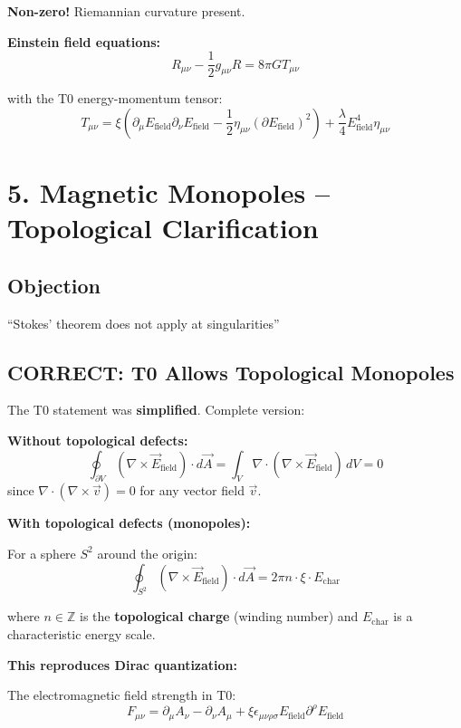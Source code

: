 	\textbf{Non-zero!} \checkmark Riemannian curvature present.
	
	\textbf{Einstein field equations:}
	\[
	R_{\mu\nu} - \frac{1}{2} g_{\mu\nu} R = 8\pi G T_{\mu\nu}
	\]
	
	with the T0 energy-momentum tensor:
	\[
	T_{\mu\nu} = \xi (\partial_\mu E_{\text{field}} \partial_\nu E_{\text{field}} - \frac{1}{2} \eta_{\mu\nu} (\partial E_{\text{field}})^2) + \frac{\lambda}{4} E_{\text{field}}^4 \eta_{\mu\nu}
	\]
	
	\section*{5. Magnetic Monopoles – Topological Clarification}
	
	\subsection*{Objection}
	``Stokes' theorem does not apply at singularities''
	
	\subsection*{\textbf{CORRECT: T0 Allows Topological Monopoles}}
	
	The T0 statement was \textbf{simplified}. Complete version:
	
	\textbf{Without topological defects:}
	\[
	\oint_{\partial V} (\nabla \times \vec{E}_{\text{field}}) \cdot d\vec{A} = \int_V \nabla \cdot (\nabla \times \vec{E}_{\text{field}}) \, dV = 0
	\]
	since $\nabla \cdot (\nabla \times \vec{v}) = 0$ for any vector field $\vec{v}$.
	
	\textbf{With topological defects (monopoles):}
	
	For a sphere $S^2$ around the origin:
	\[
	\oint_{S^2} (\nabla \times \vec{E}_{\text{field}}) \cdot d\vec{A} = 2\pi n \cdot \xi \cdot E_{\text{char}}
	\]
	
	where $n \in \mathbb{Z}$ is the \textbf{topological charge} (winding number) and $E_{\text{char}}$ is a characteristic energy scale.
	
	\textbf{This reproduces Dirac quantization:}
	
	The electromagnetic field strength in T0:
	\[
	F_{\mu\nu} = \partial_\mu A_\nu - \partial_\nu A_\mu + \xi \epsilon_{\mu\nu\rho\sigma} E_{\text{field}} \partial^\rho E_{\text{field}}
	\]
	
